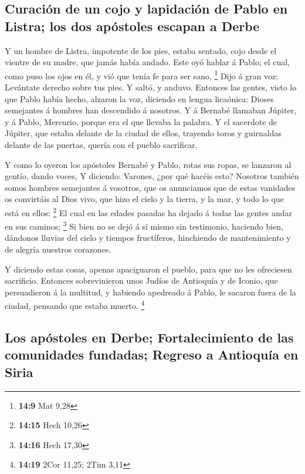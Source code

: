 \hypertarget{curaciuxf3n-de-un-cojo-y-lapidaciuxf3n-de-pablo-en-listra-los-dos-apuxf3stoles-escapan-a-derbe}{%
\subsection{Curación de un cojo y lapidación de Pablo en Listra; los dos
apóstoles escapan a
Derbe}\label{curaciuxf3n-de-un-cojo-y-lapidaciuxf3n-de-pablo-en-listra-los-dos-apuxf3stoles-escapan-a-derbe}}

 Y un hombre de Listra, impotente de los pies, estaba
sentado, cojo desde el vientre de su madre, que jamás había andado.
 Este oyó hablar á Pablo; el cual, como puso los ojos en
él, y vió que tenía fe para ser sano, \footnote{\textbf{14:9} Mat 9,28}
 Dijo á gran voz: Levántate derecho sobre tus pies. Y
saltó, y anduvo.  Entonces las gentes, visto lo que Pablo
había hecho, alzaron la voz, diciendo en lengua licaónica: Dioses
semejantes á hombres han descendido á nosotros.  Y á
Bernabé llamaban Júpiter, y á Pablo, Mercurio, porque era el que llevaba
la palabra.  Y el sacerdote de Júpiter, que estaba
delante de la ciudad de ellos, trayendo toros y guirnaldas delante de
las puertas, quería con el pueblo sacrificar.

 Y como lo oyeron los apóstoles Bernabé y Pablo, rotas
sus ropas, se lanzaron al gentío, dando voces,  Y
diciendo: Varones, ¿por qué hacéis esto? Nosotros también somos hombres
semejantes á vosotros, que os anunciamos que de estas vanidades os
convirtáis al Dios vivo, que hizo el cielo y la tierra, y la mar, y todo
lo que está en ellos: \footnote{\textbf{14:15} Hech 10,26}
 El cual en las edades pasadas ha dejado á todas las
gentes andar en sus caminos; \footnote{\textbf{14:16} Hech 17,30}
 Si bien no se dejó á sí mismo sin testimonio, haciendo
bien, dándonos lluvias del cielo y tiempos fructíferos, hinchiendo de
mantenimiento y de alegría nuestros corazones.

 Y diciendo estas cosas, apenas apaciguaron el pueblo,
para que no les ofreciesen sacrificio.  Entonces
sobrevinieron unos Judíos de Antioquía y de Iconio, que persuadieron á
la multitud, y habiendo apedreado á Pablo, le sacaron fuera de la
ciudad, pensando que estaba muerto. \footnote{\textbf{14:19} 2Cor 11,25;
  2Tim 3,11}

\hypertarget{los-apuxf3stoles-en-derbe-fortalecimiento-de-las-comunidades-fundadas-regreso-a-antioquuxeda-en-siria}{%
\subsection{Los apóstoles en Derbe; Fortalecimiento de las comunidades
fundadas; Regreso a Antioquía en
Siria}\label{los-apuxf3stoles-en-derbe-fortalecimiento-de-las-comunidades-fundadas-regreso-a-antioquuxeda-en-siria}}

